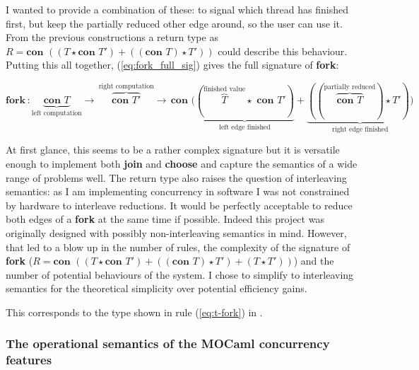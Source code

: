 \documentclass[12pt,twoside,notitlepage]{report}
\theoremstyle{plain}%
\theoremstyle{definition}
\theoremstyle{remark}
\begin{document}
I wanted to provide a combination of these: to signal which thread has finished first, but keep the partially reduced other edge around, so the user can use it. From the previous constructions a return type as $ R = \textbf{con }((T\star \textbf{con } T') + ((\textbf{con } T) \star T')) $ could describe this behaviour. Putting this all together, (\ref{eq:fork_full_sig}) gives the full signature of \textbf{fork}:

\begin{equation}
\textbf{fork} \, : \!\!\!\!\! \underbrace{\textbf{con } T}_{\text{left computation}}\!\!\!\!\!\! \rightarrow \, \!\!\!\!\!\!\overbrace{\textbf{con } T'}^{\text{right computation}}\!\!\!\!\!\!\!\! \rightarrow\, \textbf{con }(\underbrace{(\!\!\!\!\!\!\overbrace{T}^{\text{finished value}}\!\!\!\!\!\!\star\,\, \textbf{con } T')}_{\text{left edge finished}} + \underbrace{((\!\!\!\!\!\!\overbrace{\textbf{con } T}^{\text{partially reduced}}\!\!\!\!\!) \star T'))}_{\text{right edge finished}} \tag{Fork-Full-Signature}\label{eq:fork_full_sig} \end{equation}

At first glance, this seems to be a rather complex signature but  it is versatile enough to implement both \textbf{join} and \textbf{choose} and capture the semantics of a wide range of problems well. The return type also raises the question of interleaving semantics: as I am implementing concurrency in software I was not constrained by hardware to interleave reductions. It would be perfectly acceptable to reduce both edges of a \textbf{fork} at the same time if possible. Indeed this project was originally designed with possibly non-interleaving semantics in mind. However, that led to a blow up in the number of rules, the complexity of the signature of \textbf{fork} ($ R = \textbf{con }((T\star \textbf{con } T') + ((\textbf{con } T) \star T') + (T \star T'))   $) and the number of potential behaviours of the system. I chose to simplify to interleaving semantics for the theoretical simplicity over potential efficiency gains.

 



This corresponds to the type shown in rule (\ref{eq:t-fork}) in .

\subsubsection{The operational semantics of the MOCaml concurrency features}
\end{document}
